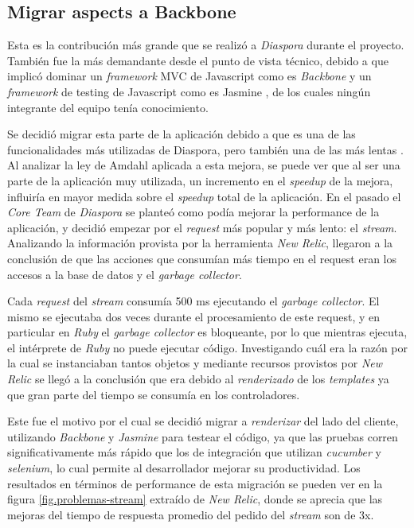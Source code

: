 \subsection{Migrar aspects a Backbone}

Esta es la contribución más grande que se realizó a \emph{Diaspora} durante el proyecto. También fue la más demandante desde el punto de vista técnico, debido a que implicó dominar un
\emph{framework} MVC de Javascript como es \emph{Backbone} y un \emph{framework} de testing de Javascript como es Jasmine \cite{jasmine}, de los cuales ningún integrante del equipo tenía
conocimiento.

Se decidió migrar esta parte de la aplicación debido a que es una de las funcionalidades más utilizadas de Diaspora, pero también una de las más lentas \cite{diasp_backbone}. Al analizar la ley de
Amdahl aplicada a esta mejora, se puede ver que al ser una parte de la aplicación muy utilizada, un incremento en el \emph{speedup} de la mejora, influiría en mayor medida sobre el
\emph{speedup} total de la aplicación.
En el pasado el \emph{Core Team} de \emph{Diaspora} se planteó como podía mejorar la performance de la aplicación, y decidió empezar por el \emph{request} más popular y más
lento: el \emph{stream}. Analizando la información provista por la herramienta \emph{New Relic}, llegaron a la conclusión de que las acciones que consumían más tiempo en el request
eran los accesos a la base de datos y el \emph{garbage collector}. 

Cada \emph{request} del \emph{stream} consumía 500 ms ejecutando el \emph{garbage collector}. El mismo se ejecutaba dos veces durante el procesamiento de este request, y en
particular en \emph{Ruby} el \emph{garbage collector} es bloqueante, por lo que mientras ejecuta, el intérprete de \emph{Ruby} no puede ejecutar código. Investigando cuál era la 
razón por la cual se instanciaban tantos objetos y mediante recursos provistos por \emph{New Relic} se llegó a  la conclusión que era debido al \emph{renderizado} de los 
\emph{templates} ya que gran parte del tiempo se consumía en los controladores.

Este fue el motivo por el cual se decidió migrar a \emph{renderizar} del lado del cliente, utilizando \emph{Backbone} y \emph{Jasmine} para testear el código, ya que las pruebas corren
significativamente más rápido que los de integración que utilizan \emph{cucumber} y \emph{selenium}, lo cual permite al desarrollador mejorar su productividad. 
Los resultados en términos de
performance de esta migración se pueden ver en la figura \ref{fig.problemas-stream} extraído de \emph{New Relic}, donde se aprecia que las mejoras del tiempo de respuesta promedio del pedido del \emph{stream} son de 3x.

